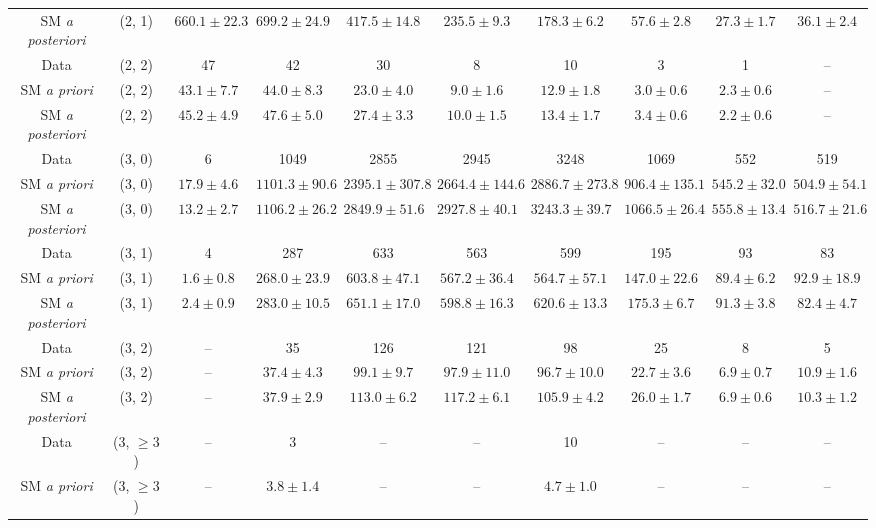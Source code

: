 \begin{table}[h!]
{\begin{tabular}{cccccccccc}
	SM \textit{a posteriori} & (2, 1) & $660.1\pm 22.3$ & $699.2\pm 24.9$ & $417.5\pm 14.8$ & $235.5\pm 9.3$ & $178.3\pm 6.2$ & $57.6\pm 2.8$ & $27.3\pm 1.7$ & $36.1\pm 2.4$ \\[0.5ex] 
	Data & (2, 2) & 47 & 42 & 30 & 8 & 10 & 3 & 1 & -- \\[0.5ex] 
	SM \textit{a priori} & (2, 2) & $43.1\pm 7.7$ & $44.0\pm 8.3$ & $23.0\pm 4.0$ & $9.0\pm 1.6$ & $12.9\pm 1.8$ & $3.0\pm 0.6$ & $2.3\pm 0.6$ & -- \\[0.5ex] 
	SM \textit{a posteriori} & (2, 2) & $45.2\pm 4.9$ & $47.6\pm 5.0$ & $27.4\pm 3.3$ & $10.0\pm 1.5$ & $13.4\pm 1.7$ & $3.4\pm 0.6$ & $2.2\pm 0.6$ & -- \\[0.5ex] 
	Data & (3, 0) & 6 & 1049 & 2855 & 2945 & 3248 & 1069 & 552 & 519 \\[0.5ex] 
	SM \textit{a priori} & (3, 0) & $17.9\pm 4.6$ & $1101.3\pm 90.6$ & $2395.1\pm 307.8$ & $2664.4\pm 144.6$ & $2886.7\pm 273.8$ & $906.4\pm 135.1$ & $545.2\pm 32.0$ & $504.9\pm 54.1$ \\[0.5ex] 
	SM \textit{a posteriori} & (3, 0) & $13.2\pm 2.7$ & $1106.2\pm 26.2$ & $2849.9\pm 51.6$ & $2927.8\pm 40.1$ & $3243.3\pm 39.7$ & $1066.5\pm 26.4$ & $555.8\pm 13.4$ & $516.7\pm 21.6$ \\[0.5ex] 
	Data & (3, 1) & 4 & 287 & 633 & 563 & 599 & 195 & 93 & 83 \\[0.5ex] 
	SM \textit{a priori} & (3, 1) & $1.6\pm 0.8$ & $268.0\pm 23.9$ & $603.8\pm 47.1$ & $567.2\pm 36.4$ & $564.7\pm 57.1$ & $147.0\pm 22.6$ & $89.4\pm 6.2$ & $92.9\pm 18.9$ \\[0.5ex] 
	SM \textit{a posteriori} & (3, 1) & $2.4\pm 0.9$ & $283.0\pm 10.5$ & $651.1\pm 17.0$ & $598.8\pm 16.3$ & $620.6\pm 13.3$ & $175.3\pm 6.7$ & $91.3\pm 3.8$ & $82.4\pm 4.7$ \\[0.5ex] 
	Data & (3, 2) & -- & 35 & 126 & 121 & 98 & 25 & 8 & 5 \\[0.5ex] 
	SM \textit{a priori} & (3, 2) & -- & $37.4\pm 4.3$ & $99.1\pm 9.7$ & $97.9\pm 11.0$ & $96.7\pm 10.0$ & $22.7\pm 3.6$ & $6.9\pm 0.7$ & $10.9\pm 1.6$ \\[0.5ex] 
	SM \textit{a posteriori} & (3, 2) & -- & $37.9\pm 2.9$ & $113.0\pm 6.2$ & $117.2\pm 6.1$ & $105.9\pm 4.2$ & $26.0\pm 1.7$ & $6.9\pm 0.6$ & $10.3\pm 1.2$ \\[0.5ex] 
	Data & (3, $\ge3$) & -- & 3 & -- & -- & 10 & -- & -- & -- \\[0.5ex] 
	SM \textit{a priori} & (3, $\ge3$) & -- & $3.8\pm 1.4$ & -- & -- & $4.7\pm 1.0$ & -- & -- & -- \\[0.5ex] 

\end{tabular}}
\end{table}
